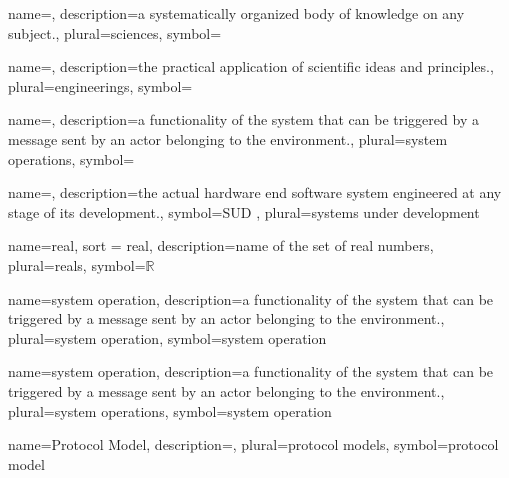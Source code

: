 
\DeclareRobustCommand{\glsict}{{information and communication technological}~}

%
{name={},%
description={a systematically organized body of knowledge on any subject.},%
plural={sciences},%
symbol={}%
}

{name={},
description={the practical application of scientific ideas and principles.},
plural={engineerings},
symbol={}
}

{name={},
description={a functionality of the system that can be triggered by a message sent by an actor belonging to the environment.},
plural={system operations},
symbol={}
}

{name={},
description={the actual hardware end software system engineered at any stage of its development.},
symbol=SUD ,
plural={systems under development}
}

{name={real},
sort = real,
description={name of the set of real numbers},
plural={reals},
symbol={\ensuremath{\mathbb{R}}}
}

{name={system operation},
description={a functionality of the system that can be triggered by a message sent by an actor belonging to the environment.},
plural={system operation},
symbol=system operation
}

{name=system operation,
description={a functionality of the system that can be triggered by a message sent by an actor belonging to the environment.},
plural={system operations},
symbol=system operation
}

{name=Protocol Model,
description={},
plural={protocol models},
symbol=protocol model
}

